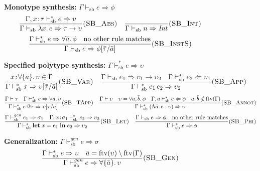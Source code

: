 \documentclass[11pt,a4paper]{article}
\begin{document}
\begin{figure}[p]
\centering
\textbf{Monotype synthesis:} $\boxed{\Gamma \vdash_{\mathrm{sb}} e \Rightarrow \phi}$
\[
\frac{\Gamma, x\!:\!\tau \vdash_{\mathrm{sb}}^{*} e \Rightarrow \upsilon}{\Gamma \vdash_{\mathrm{sb}} \lambda x.\, e \Rightarrow \tau \to \upsilon}\textsc{(SB\_Abs)}
\quad
\frac{}{\Gamma \vdash_{\mathrm{sb}} n \Rightarrow \mathit{Int}}\textsc{(SB\_Int)}
\]
\[
\frac{\Gamma \vdash_{\mathrm{sb}}^{*} e \Rightarrow \forall \bar{a}.\, \phi \quad \text{no other rule matches}}{\Gamma \vdash_{\mathrm{sb}} e \Rightarrow \phi[\bar{\tau}/\bar{a}]}\textsc{(SB\_InstS)}
\]

\vspace{1em}
\textbf{Specified polytype synthesis:} $\boxed{\Gamma \vdash_{\mathrm{sb}}^{*} e \Rightarrow \upsilon}$
\[
\frac{x\!:\!\forall\{\bar{a}\}.\, \upsilon \in \Gamma}{\Gamma \vdash_{\mathrm{sb}}^{*} x \Rightarrow \upsilon[\bar{\tau}/\bar{a}]}\textsc{(SB\_Var)}
\quad
\frac{\Gamma \vdash_{\mathrm{sb}} e_1 \Rightarrow \upsilon_1 \to \upsilon_2 \quad \Gamma \vdash_{\mathrm{sb}}^{*} e_2 \Leftarrow \upsilon_1}{\Gamma \vdash_{\mathrm{sb}}^{*} e_1\, e_2 \Rightarrow \upsilon_2}\textsc{(SB\_App)}
\]
\[
\frac{\Gamma \vdash \tau \quad \Gamma \vdash_{\mathrm{sb}}^{*} e \Rightarrow \forall a.\, \upsilon}{\Gamma \vdash_{\mathrm{sb}}^{*} e\, @\tau \Rightarrow \upsilon[\tau/a]}\textsc{(SB\_TApp)}
\quad
\frac{\Gamma \vdash \upsilon \quad \upsilon = \forall \bar{a}, \bar{b}.\, \phi \quad \Gamma, \bar{a} \vdash_{\mathrm{sb}}^{*} e \Leftarrow \phi \quad \bar{a}, \bar{b} \notin \mathrm{ftv}(\Gamma)}{\Gamma \vdash_{\mathrm{sb}}^{*} (\Lambda \bar{a}.\, e : \upsilon) \Rightarrow \upsilon}\textsc{(SB\_Annot)}
\]
\[
\frac{\Gamma \vdash_{\mathrm{sb}}^{\mathit{gen}} e_1 \Rightarrow \sigma_1 \quad \Gamma, x\!:\!\sigma_1 \vdash_{\mathrm{sb}}^{*} e_2 \Rightarrow \upsilon_2}{\Gamma \vdash_{\mathrm{sb}}^{*} \mathbf{let}\; x = e_1 \;\mathbf{in}\; e_2 \Rightarrow \upsilon_2}\textsc{(SB\_Let)}
\quad
\frac{\Gamma \vdash_{\mathrm{sb}} e \Rightarrow \phi \quad \text{no other rule matches}}{\Gamma \vdash_{\mathrm{sb}}^{*} e \Rightarrow \phi}\textsc{(SB\_Phi)}
\]

\vspace{1em}
\textbf{Generalization:} $\boxed{\Gamma \vdash_{\mathrm{sb}}^{\mathit{gen}} e \Rightarrow \sigma}$
\[
\frac{\Gamma \vdash_{\mathrm{sb}}^{*} e \Rightarrow \upsilon \quad \bar{a} = \mathrm{ftv}(\upsilon) \setminus \mathrm{ftv}(\Gamma)}{\Gamma \vdash_{\mathrm{sb}}^{\mathit{gen}} e \Rightarrow \forall\{\bar{a}\}.\, \upsilon}\textsc{(SB\_Gen)}
\]


\end{figure}
\end{document}
